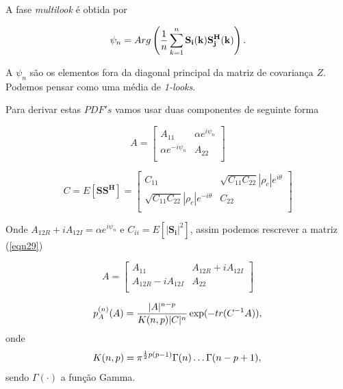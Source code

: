 \documentclass[12pt,a4paper]{article}
\begin{document}
A fase {\it multilook} é obtida por 

\begin{equation}\label{eqn28}
	\psi_n=Arg\left(\frac{1}{n}\sum_{k=1}^{n}\mathbf{S_i(k)S_j^{H}(k)}\right). \\
\end{equation}

A $\psi_n$ são os elementos fora da diagonal principal da matriz de covariança $Z$. Podemos pensar como uma média de {\it 1-looks}.

Para derivar estas $PDF's$ vamos usar duas componentes de seguinte forma

\begin{equation}\label{eqn29}
	A=\left[
\begin{array}{cc}
	A_{11}              & \alpha e^{i\psi_n} \\
	\alpha e^{-i\psi_n} & A_{22} \\
\end{array}\right]
\end{equation}


\begin{equation}\label{eqn30}
	C=E[\mathbf{SS^{H}}]=\left[
\begin{array}{cc}
	C_{11}              & \sqrt{C_{11}C_{22}}|\rho_c|e^{i\theta} \\
 \sqrt{C_{11}C_{22}}|\rho_c |e^{-i\theta} & C_{22}\\
\end{array}\right]
\end{equation}

Onde $A_{12R}+iA_{12I}=\alpha e^{i\psi_n}$ e $C_{ii}=E[|\mathbf{S_i}|^2]$, assim podemos rescrever a matriz (\ref{eqn29})

\begin{equation}\label{eqn31}
	A=\left[
\begin{array}{cc}
	A_{11}              & A_{12R}+iA_{12I} \\
	A_{12R}-iA_{12I}    & A_{22} \\
\end{array}\right]
\end{equation}


\begin{equation}\label{eqn32}
	p_A^{(n)}(A)=\frac{|A|^{n-p}}{K(n,p)|C|^n} \exp(-tr(C^{-1}A)), \\
\end{equation}
onde
\begin{equation}\label{eqn33}
	K(n,p)=\pi^{\frac{1}{2}p(p-1)}\Gamma(n)\dots\Gamma(n-p+1), \\
\end{equation}
sendo $\Gamma(\cdot)$ a função Gamma.
\end{document}
